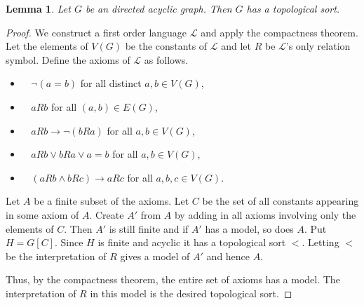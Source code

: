 \documentclass[12pt]{kluwer}
\newtheorem{lem}[thm]{Lemma}
\theoremstyle{remark}
\newcommand{\fancy}[1]{\mathcal{#1}}
\begin{document}
\begin{lem}\label{TopSortExists}
Let $G$ be an directed acyclic graph. Then $G$ has a topological sort.
\end{lem}
\begin{proof}
We construct a first order language $\fancy{L}$ and apply the compactness theorem.  Let the elements of $V(G)$ be the constants of $\fancy{L}$ and let $R$ be $\fancy{L}$'s only relation symbol.  Define the axioms of $\fancy{L}$ as follows.

\begin{itemize}
\item $\;\;$ $\neg (a = b)$ for all distinct $a,b \in V(G)$,
\item $\;\;$ $aRb$ for all $(a,b) \in E(G)$,
\item $\;\;$ $aRb \rightarrow \neg (bRa)$ for all $a,b \in V(G)$,
\item $\;\;$ $aRb \vee bRa \vee a = b$ for all $a,b \in V(G)$,
\item $\;\;$ $(aRb \wedge bRc) \rightarrow aRc$ for all $a,b,c \in V(G)$.
\end{itemize}

Let $A$ be a finite subset of the axioms.  Let $C$ be the set of all constants appearing in some axiom of $A$.  Create $A'$ from $A$ by adding in all axioms involving only the elements of $C$.  Then $A'$ is still finite and if $A'$ has a model, so does $A$.  Put $H = G[C]$.  Since $H$ is finite and acyclic it has a topological sort $<$.  Letting $<$ be the interpretation of $R$ gives a model of $A'$ and hence $A$.\newline

Thus, by the compactness theorem, the entire set of axioms has a model.  The interpretation of $R$ in this model is the desired topological sort.
\end{proof}
\end{document}
